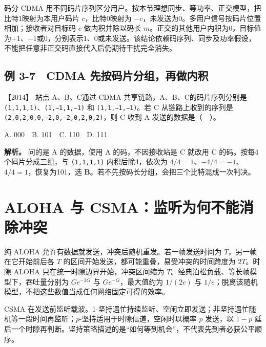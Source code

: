 码分 CDMA 用不同码片序列区分用户。按本节理想同步、等功率、正交模型，把比特1映射为本用户码片 \(c\)，比特0映射为 \(-c\)，未发送为0。多用户信号按码片位置相加；接收者对目标码 \(c\) 做内积并除以码长 \(m\)。正交的其他用户内积为0，目标值为+1、−1或0，分别表示1、0或未发送。该结论依赖码序列、同步及功率假设，不能把任意非正交码直接代入后仍期待干扰完全消失。

\subsection{例 3-7　CDMA 先按码片分组，再做内积}\label{cn-ex3-7}

\noindent{}【2014】 站点 A、B、C通过 CDMA 共享链路，A、B、C的码片序列分别是 \texttt{(1,}\allowbreak{}\texttt{1,}\allowbreak{}\texttt{1,}\allowbreak{}\texttt{1)}、\texttt{(1,}\allowbreak{}\texttt{−1,}\allowbreak{}\texttt{1,}\allowbreak{}\texttt{−1)} 和 \texttt{(1,}\allowbreak{}\texttt{1,}\allowbreak{}\texttt{−1,}\allowbreak{}\texttt{−1)}。若 C 从链路上收到的序列是 \texttt{(2,}\allowbreak{}\texttt{0,}\allowbreak{}\texttt{2,}\allowbreak{}\texttt{0,}\allowbreak{}\texttt{0,}\allowbreak{}\texttt{−2,}\allowbreak{}\texttt{0,}\allowbreak{}\texttt{−2,}\allowbreak{}\texttt{0,}\allowbreak{}\texttt{2,}\allowbreak{}\texttt{0,}\allowbreak{}\texttt{2)}，则 C 收到 A 发送的数据是（　）。

A. 000　B. 101　C. 110　D. 111


\textbf{解析。} 问的是 A 的数据，使用 A 的码，不因接收站是 C 就改用 C 的码。按每4个码片分成三组，与 \texttt{(1,}\allowbreak{}\texttt{1,}\allowbreak{}\texttt{1,}\allowbreak{}\texttt{1)} 内积后除4，依次为 \(4/4=1\)、\(-4/4=-1\)、\(4/4=1\)，恢复为101，选 \textbf{B}。若不先按码长分组，会把三个比特混成一次判决。

\section{ALOHA 与 CSMA：监听为何不能消除冲突}\label{cn-03-10}

纯 ALOHA 允许有数据就发送，冲突后随机重发。若一帧发送时间为 \(T\)，另一帧在它开始前后各 \(T\) 的区间开始发送，都可能重叠，易受冲突的时间跨度为 \(2T\)。时隙 ALOHA 只在统一时隙边界开始，冲突区间缩为 \(T\)。经典泊松负载、等长帧模型下，吞吐量分别为 \(Ge^{-2G}\) 与 \(Ge^{-G}\)，最大值约为 \(1/(2e)\) 与 \(1/e\)；脱离该随机模型，不把这些数值当成任何网络固定可得的效率。

CSMA 在发送前监听载波。1-坚持遇忙持续监听、空闲立即发送；非坚持遇忙随机等一段时间再监听；\(p\)-坚持适用于时隙信道，空闲时以概率 \(p\) 发送，以 \(1-p\) 延后一个时隙再判断。坚持策略描述的是``如何等到机会''，不代表先到者必获公平顺序。

